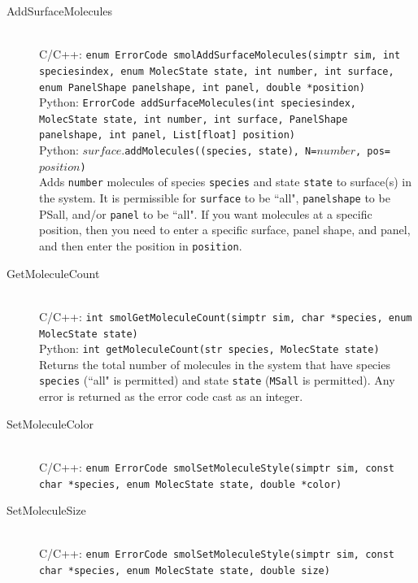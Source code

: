 \documentclass {scrbook}
\newcommand {\ttt} {\texttt}
\begin{document}
\begin{description}
\item[AddSurfaceMolecules]
\hfill \\
C/C++: \ttt{enum ErrorCode smolAddSurfaceMolecules(simptr sim, int speciesindex, enum MolecState state, int number, int surface, enum PanelShape panelshape, int panel, double *position)}\\
Python: \ttt{ErrorCode addSurfaceMolecules(int speciesindex, MolecState state, int number, int surface, PanelShape panelshape, int panel, List[float] position)}\\
Python: $surface$.\ttt{addMolecules((species, state), N=$number$, pos=$position$)}\\
Adds \ttt{number} molecules of species \ttt{species} and state \ttt{state} to surface(s) in the system. It is permissible for \ttt{surface} to be ``all", \ttt{panelshape} to be PSall, and/or \ttt{panel} to be ``all". If you want molecules at a specific position, then you need to enter a specific surface, panel shape, and panel, and then enter the position in \ttt{position}.

\item[GetMoleculeCount]
\hfill \\
C/C++: \ttt{int smolGetMoleculeCount(simptr sim, char *species, enum MolecState state)}\\
Python: \ttt{int getMoleculeCount(str species, MolecState state)}\\
Returns the total number of molecules in the system that have species \ttt{species} (``all" is permitted) and state \ttt{state} (\ttt{MSall} is permitted). Any error is returned as the error code cast as an integer.

\item[SetMoleculeColor]
\hfill \\
C/C++: \ttt{enum ErrorCode smolSetMoleculeStyle(simptr sim, const char *species, enum MolecState state, double *color)}\\

\item[SetMoleculeSize]
\hfill \\
C/C++: \ttt{enum ErrorCode smolSetMoleculeStyle(simptr sim, const char *species, enum MolecState state, double size)}\\



\end{description}
\end{document}
